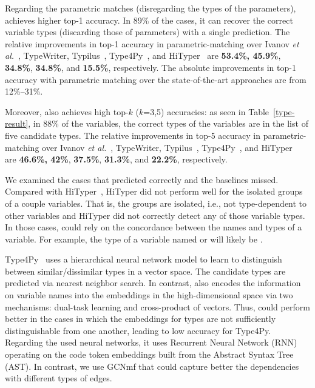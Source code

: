 Regarding the parametric matches (disregarding the types of the
parameters), {\tool} achieves higher top-1 accuracy. In 89\% of the
cases, it can recover the correct variable types (discarding those of
parameters) with a single prediction. The relative improvements in
top-1 accuracy in parametric-matching over Ivanov {\em et
  al.}~\cite{ivanov21predicting}, TypeWriter\cite{typewriter-fse20},
Typilus~\cite{typilus-pldi20}, Type4Py~\cite{Type4Py-icse22}, and
HiTyper~\cite{HiTyper-icse22} are {\bf 53.4\%, 45.9\%}, {\bf 34.8\%},
{\bf 34.8\%}, and {\bf 15.5\%}, respectively. The absolute
improvements in top-1 accuracy with parametric matching over the
state-of-the-art approaches are from 12\%--31\%.



Moreover, {\tool} also achieves high top-$k$ ($k$=3,5) accuracies: as
seen in Table~\ref{type-result}, in 88\% of the variables, the correct
types of the variables are in the list of five candidate types. The
relative improvements in top-5 accuracy in parametric-matching over
Ivanov {\em et al.}~\cite{ivanov21predicting}, TypeWriter\cite{typewriter-fse20},
Typilus~\cite{typilus-pldi20}, 
Type4Py~\cite{Type4Py-icse22}, and HiTyper~\cite{HiTyper-icse22} are
{\bf 46.6\%, 42\%}, {\bf 37.5\%}, {\bf 31.3\%}, and {\bf 22.2\%},
respectively.


We examined the cases that {\tool} predicted correctly and the
baselines missed. Compared with HiTyper~\cite{HiTyper-icse22}, HiTyper
did not perform well for the isolated groups of a couple
variables. That is, the groups are isolated, i.e., not type-dependent
to other variables and HiTyper did not correctly detect any of those
variable types. In those cases, {\tool} could rely on the concordance
between the names and types of a variable. For example, the type of a
variable named  or  will likely be .

Type4Py~\cite{Type4Py-icse22} uses a hierarchical neural network model
to learn to distinguish between similar/dissimilar types in a vector
space. The candidate types are predicted via nearest neighbor search.
In contrast, {\tool} also encodes the information on variable names
into the embeddings in the high-dimensional space via two mechanisms:
dual-task learning and cross-product of vectors. Thus, {\tool} could
perform better in the cases in which the embeddings for types are not
sufficiently distinguishable from one another, leading to low accuracy
for Type4Py. Regarding the used neural networks, it uses Recurrent
Neural Network (RNN) operating on the code token embeddings built from
the Abstract Syntax Tree (AST). In contrast, we use GCNmf that could
capture better the dependencies with different types of edges.

